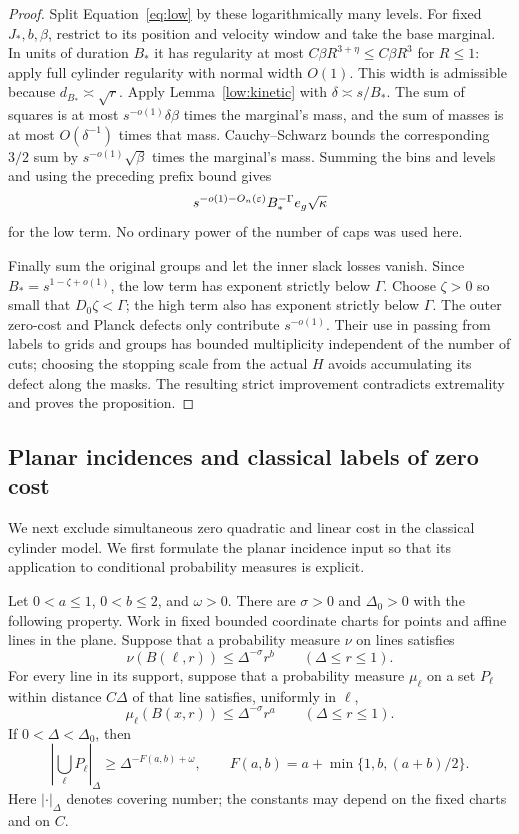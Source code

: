 \begin{proof}
Split Equation~\eqref{eq:low} by these logarithmically many levels.
For fixed $J_*,b,\beta$, restrict to its position and velocity window
and take the base marginal. In units of duration $B_*$ it has
regularity at most $C\beta R^{3+\eta}\leq C\beta R^3$ for $R\leq1$:
apply full cylinder regularity with normal width $O(1)$. This width is
admissible because $d_{B_*}\asymp\sqrt r$. Apply
Lemma~\ref{low:kinetic} with $\delta\asymp s/B_*$. The sum of squares
is at most $s^{-o(1)}\delta\beta$ times the marginal's mass, and the
sum of masses is at most $O(\delta^{-1})$ times that mass.
Cauchy--Schwarz bounds the corresponding $3/2$ sum by
$s^{-o(1)}\sqrt\beta$ times the marginal's mass. Summing the bins and
levels and using the preceding prefix bound gives
\[
 s^{-o(1)-O_n(\varepsilon)}B_*^{-\Gamma}e_g\sqrt\kappa
\]
for the low term. No ordinary power of the number of caps was used here.

Finally sum the original groups and let the inner slack losses vanish.
Since $B_*=s^{1-\zeta+o(1)}$, the low term has exponent strictly below
$\Gamma$. Choose $\zeta>0$ so small that $D_0\zeta<\Gamma$; the high
term also has exponent strictly below $\Gamma$. The outer zero-cost
and Planck defects only contribute $s^{-o(1)}$. Their use in passing
from labels to grids and groups has bounded multiplicity independent
of the number of cuts; choosing the stopping scale from the actual $H$
avoids accumulating its defect along the masks. The resulting strict
improvement contradicts extremality and proves the proposition.
\end{proof}

\subsection{Planar incidences and classical labels of zero cost}
\label{low:planar}

We next exclude simultaneous zero quadratic and linear cost in the classical
cylinder model. We first formulate the planar incidence input so that its
application to conditional probability measures is explicit.

\begin{theorem}
\label{low:ren-wang}
Let $0<a\leq 1$, $0<b\leq 2$, and $\omega>0$. There are
$\sigma>0$ and $\Delta_0>0$ with the following property. Work in fixed bounded
coordinate charts for points and affine lines in the plane. Suppose that a
probability measure $\nu$ on lines satisfies
\[
 \nu(B(\ell,r))\leq \Delta^{-\sigma}r^b
 \qquad (\Delta\leq r\leq 1).
\]
For every line in its support, suppose that a probability measure $\mu_\ell$
on a set $P_\ell$ within distance $C\Delta$ of that line satisfies,
uniformly in $\ell$,
\[
 \mu_\ell(B(x,r))\leq\Delta^{-\sigma}r^a
 \qquad(\Delta\leq r\leq1).
\]
If $0<\Delta<\Delta_0$, then
\begin{equation}
 \left|\bigcup_\ell P_\ell\right|_\Delta
 \geq \Delta^{-F(a,b)+\omega},
 \qquad F(a,b)=a+\min\{1,b,(a+b)/2\}.
 \tag{RW}\label{eq:RW}
\end{equation}
Here $|\cdot|_\Delta$ denotes covering number; the constants may depend on the
fixed charts and on $C$.
\end{theorem}

